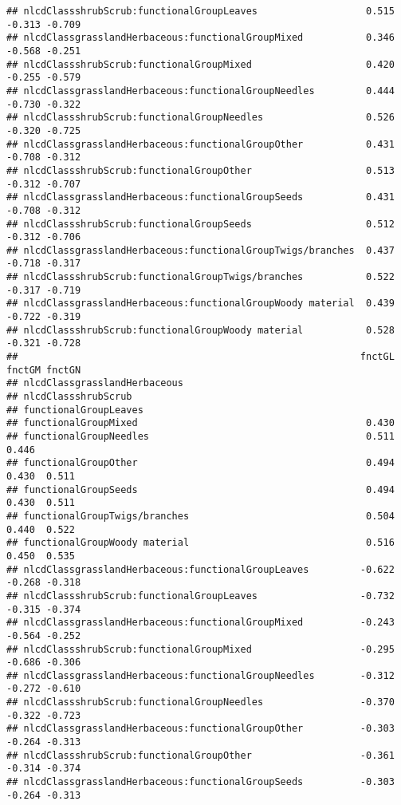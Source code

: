 \documentclass[]{article}
\begin{document}
\begin{verbatim}
## nlcdClassshrubScrub:functionalGroupLeaves                   0.515 -0.313 -0.709
## nlcdClassgrasslandHerbaceous:functionalGroupMixed           0.346 -0.568 -0.251
## nlcdClassshrubScrub:functionalGroupMixed                    0.420 -0.255 -0.579
## nlcdClassgrasslandHerbaceous:functionalGroupNeedles         0.444 -0.730 -0.322
## nlcdClassshrubScrub:functionalGroupNeedles                  0.526 -0.320 -0.725
## nlcdClassgrasslandHerbaceous:functionalGroupOther           0.431 -0.708 -0.312
## nlcdClassshrubScrub:functionalGroupOther                    0.513 -0.312 -0.707
## nlcdClassgrasslandHerbaceous:functionalGroupSeeds           0.431 -0.708 -0.312
## nlcdClassshrubScrub:functionalGroupSeeds                    0.512 -0.312 -0.706
## nlcdClassgrasslandHerbaceous:functionalGroupTwigs/branches  0.437 -0.718 -0.317
## nlcdClassshrubScrub:functionalGroupTwigs/branches           0.522 -0.317 -0.719
## nlcdClassgrasslandHerbaceous:functionalGroupWoody material  0.439 -0.722 -0.319
## nlcdClassshrubScrub:functionalGroupWoody material           0.528 -0.321 -0.728
##                                                            fnctGL fnctGM fnctGN
## nlcdClassgrasslandHerbaceous                                                   
## nlcdClassshrubScrub                                                            
## functionalGroupLeaves                                                          
## functionalGroupMixed                                        0.430              
## functionalGroupNeedles                                      0.511  0.446       
## functionalGroupOther                                        0.494  0.430  0.511
## functionalGroupSeeds                                        0.494  0.430  0.511
## functionalGroupTwigs/branches                               0.504  0.440  0.522
## functionalGroupWoody material                               0.516  0.450  0.535
## nlcdClassgrasslandHerbaceous:functionalGroupLeaves         -0.622 -0.268 -0.318
## nlcdClassshrubScrub:functionalGroupLeaves                  -0.732 -0.315 -0.374
## nlcdClassgrasslandHerbaceous:functionalGroupMixed          -0.243 -0.564 -0.252
## nlcdClassshrubScrub:functionalGroupMixed                   -0.295 -0.686 -0.306
## nlcdClassgrasslandHerbaceous:functionalGroupNeedles        -0.312 -0.272 -0.610
## nlcdClassshrubScrub:functionalGroupNeedles                 -0.370 -0.322 -0.723
## nlcdClassgrasslandHerbaceous:functionalGroupOther          -0.303 -0.264 -0.313
## nlcdClassshrubScrub:functionalGroupOther                   -0.361 -0.314 -0.374
## nlcdClassgrasslandHerbaceous:functionalGroupSeeds          -0.303 -0.264 -0.313

\end{verbatim}
\end{document}
